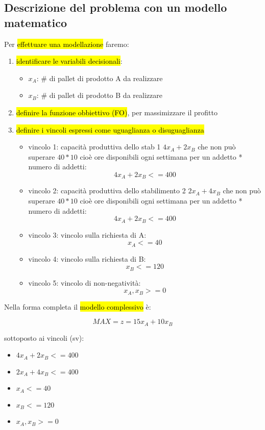 \subsection{Descrizione del problema con un modello matematico}

Per \hl{effettuare una modellazione} faremo:

\begin{enumerate}
	\item \hl{identificare le variabili decisionali}:
		\begin{itemize}
			\item $x_A$: \# di pallet di prodotto A da realizzare
			\item $x_B$: \# di pallet di prodotto B da realizzare
		\end{itemize}
		
	\item \hl{definire la funzione obbiettivo (FO)}, per massimizzare il profitto

	\item \hl{definire i vincoli espressi come uguaglianza o disuguaglianza}
		\begin{itemize}
			\item vincolo 1: capacità produttiva dello stab 1 $4x_A+2x_B$ che non può superare $40*10$ cioè ore disponibili ogni settimana per un addetto * numero di addetti: $$4x_A+2x_B <= 400$$
			\item vincolo 2: capacità produttiva dello stabilimento 2 $2x_A+4x_B$ che non può superare $40*10$ cioè ore disponibili ogni settimana per un addetto * numero di addetti: $$4x_A+2x_B <= 400$$
			\item vincolo 3: vincolo sulla richiesta di A: $$x_A <= 40$$
			\item vincolo 4: vincolo sulla richiesta di B: $$x_B <= 120$$
			\item vincolo 5: vincolo di non-negatività: $$x_A, x_B >= 0$$
		\end{itemize}
		
	
\end{enumerate}

	
	
Nella forma completa il \hl{modello complessivo} è:

$$MAX=z=15x_A+10x_B$$

sottoposto ai vincoli (sv):

\begin{itemize}
	\item $4x_A+2x_B <= 400$
	\item $2x_A+4x_B <= 400$
	\item $x_A <= 40$
	\item $x_B <= 120$
	\item $x_A, x_B >= 0$
\end{itemize}


